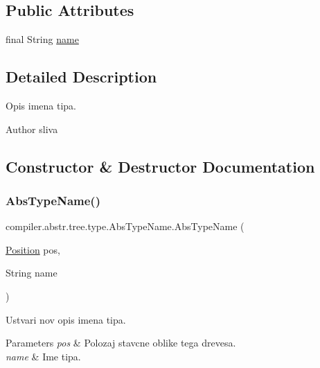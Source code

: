 \subsection*{Public Attributes}
\begin{DoxyCompactItemize}
\item 
final String \hyperlink{classcompiler_1_1abstr_1_1tree_1_1type_1_1_abs_type_name_a41a111c2c38fc5178c2160497a7bb017}{name}
\end{DoxyCompactItemize}


\subsection{Detailed Description}
Opis imena tipa.

\begin{DoxyAuthor}{Author}
sliva 
\end{DoxyAuthor}


\subsection{Constructor \& Destructor Documentation}
\mbox{\label{classcompiler_1_1abstr_1_1tree_1_1type_1_1_abs_type_name_a38f4c0c37de6e29bcfe47266025d2b4b}} 
\subsubsection{\texorpdfstring{Abs\+Type\+Name()}{AbsTypeName()}}
{\footnotesize\ttfamily compiler.\+abstr.\+tree.\+type.\+Abs\+Type\+Name.\+Abs\+Type\+Name (\begin{DoxyParamCaption}\item[{\hyperlink{classcompiler_1_1_position}{Position}}]{pos,  }\item[{String}]{name }\end{DoxyParamCaption})}

Ustvari nov opis imena tipa.


\begin{DoxyParams}{Parameters}
{\em pos} & Polozaj stavcne oblike tega drevesa. \\
\hline
{\em name} & Ime tipa. \\
\hline
\end{DoxyParams}


